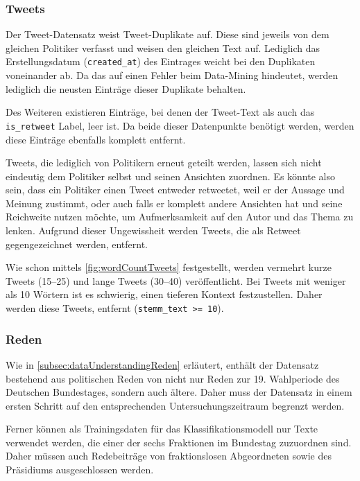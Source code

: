 \subsubsection*{Tweets} \label{subsubsec:filteringTweets}


Der Tweet-Datensatz \textcite{saltzer_finding_2022} weist Tweet-Duplikate auf. Diese sind jeweils von dem gleichen Politiker verfasst und weisen den gleichen Text auf. Lediglich das Erstellungsdatum (\texttt{created\_at}) des Eintrages weicht bei den Duplikaten voneinander ab. Da das auf einen Fehler beim Data-Mining hindeutet, werden lediglich die neusten Einträge dieser Duplikate behalten.

Des Weiteren existieren Einträge, bei denen der Tweet-Text als auch das \texttt{is\_retweet} Label, leer ist. Da beide dieser Datenpunkte benötigt werden, werden diese Einträge ebenfalls komplett entfernt. 

Tweets, die lediglich von Politikern erneut geteilt werden, lassen sich nicht eindeutig dem Politiker selbst und seinen Ansichten zuordnen. Es könnte also sein, dass ein Politiker einen Tweet entweder retweetet, weil er der Aussage und Meinung zustimmt, oder auch falls er komplett andere Ansichten hat und seine Reichweite nutzen möchte, um Aufmerksamkeit auf den Autor und das Thema zu lenken. Aufgrund dieser Ungewissheit werden Tweets, die als Retweet gegengezeichnet werden, entfernt.

Wie schon mittels \autoref{fig:wordCountTweets} festgestellt, werden vermehrt kurze Tweets (\numrange{15}{25}) und lange Tweets (\numrange{30}{40}) veröffentlicht. Bei Tweets mit weniger als \num{10} Wörtern ist es schwierig, einen tieferen Kontext festzustellen. Daher werden diese Tweets, entfernt (\texttt{stemm\_text >= 10}).

\subsubsection*{Reden}

Wie in \autoref{subsec:dataUnderstandingReden} erläutert, enthält der Datensatz bestehend aus politischen Reden von \citeauthor{richter_open_2021} nicht nur Reden zur 19. Wahlperiode des Deutschen Bundestages, sondern auch ältere. Daher muss der Datensatz in einem ersten Schritt auf den entsprechenden Untersuchungszeitraum begrenzt werden.

Ferner können als Trainingsdaten für das Klassifikationsmodell nur Texte verwendet werden, die einer der sechs Fraktionen im Bundestag zuzuordnen sind. Daher müssen auch Redebeiträge von fraktionslosen Abgeordneten sowie des Präsidiums ausgeschlossen werden.

